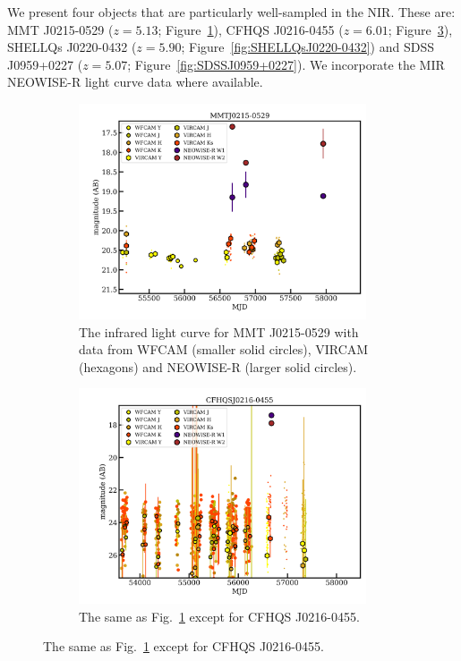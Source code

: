 \documentclass[usenatbib]{mnras}
\begin{document}
We present four objects that are particularly well-sampled in the NIR. 
These are: 
MMT J0215-0529       ($z=5.13$; Figure~\ref{fig:MMTJ0215-0529}), 
CFHQS J0216-0455    ($z=6.01$; Figure~\ref{fig:CFHQSJ0216-0455}), 
SHELLQs J0220-0432 ($z=5.90$; Figure~\ref{fig:SHELLQsJ0220-0432}) 
and 
SDSS J0959+0227 ($z=5.07$; Figure~\ref{fig:SDSSJ0959+0227}). 
We incorporate the MIR NEOWISE-R light curve data where available. 

\begin{figure}
  \begin{subfigure}{}
    \centering
    \includegraphics[width=8.5cm]{../light_curves/MMTJ0215-0529LC_20190214.png}
    \caption{The infrared light curve for MMT J0215-0529 with data from 
      WFCAM (smaller solid circles), VIRCAM (hexagons) and NEOWISE-R (larger solid circles).}
    \label{fig:MMTJ0215-0529}
  \end{subfigure} 
  \begin{subfigure}{}
    \centering
    \includegraphics[width=8.5cm]{../light_curves/CFHQSJ0216-0455LC_20190214.png}
    \caption{The same as Fig.~\ref{fig:MMTJ0215-0529} except for CFHQS J0216-0455.}
    \label{fig:CFHQSJ0216-0455}
  \end{subfigure}
\end{figure}
\end{document}
